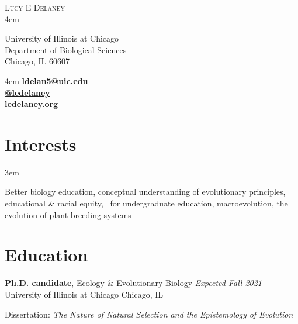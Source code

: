 \documentclass[]{article}
\begin{document}
\BgThispage
\pagestyle{alldocument}

{\fontsize{20}{64}\selectfont \textsc{Lucy E Delaney}}\\
\leftskip 4em
\begin{multicols}{2}

University of Illinois at Chicago\\
Department of Biological Sciences\\
Chicago, IL 60607

\columnbreak

\begin{flushright}
\rightskip 4em
\href{mailto:ldelan5@uic.edu}{\textbf{ldelan5@uic.edu}} \textcolor{light-gray}{\faPaperPlane}\\
\href{https://github.com/ledelaney}{\textbf{@ledelaney}} \textcolor{light-gray}{\faGithub}\\
\href{https://ledelaney.org}{\textbf{ledelaney.org}} \textcolor{light-gray}{\faDesktop}
\end{flushright}

\end{multicols}

\vspace{3mm}

\section{Interests}
\vspace{3mm}

\leftskip 3em

Better biology education, conceptual understanding of evolutionary principles, educational \& racial equity, \textcolor{light-gray}{\faRProject}\ for undergraduate education, macroevolution, the evolution of plant breeding systems

\vspace{3mm}
\section{Education}
\vspace{3mm}

\textbf{Ph.D. candidate}, Ecology \& Evolutionary Biology \hfill \textit{Expected Fall 2021}\\ 
University of Illinois at Chicago \hfill Chicago, IL
     
Dissertation: \emph{The Nature of Natural Selection and the Epistemology of Evolution} 
\vspace{0.3cm}
\end{document}
